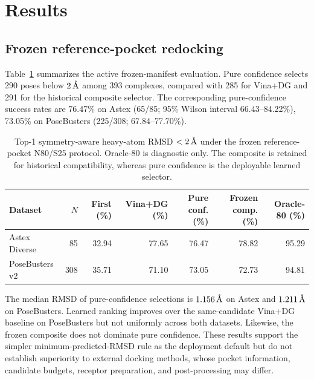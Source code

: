 \section{Results}
\label{sec:results}

\subsection{Frozen reference-pocket redocking}

Table~\ref{tab:frozen_benchmark} summarizes the active frozen-manifest
evaluation. Pure confidence selects 290 poses below \(2\,\text{\normalfont\AA}\) among
393 complexes, compared with 285 for Vina+DG and 291 for the historical
composite selector. The corresponding pure-confidence success rates are
76.47\% on Astex (65/85; 95\% Wilson interval 66.43--84.22\%), 73.05\% on
PoseBusters (225/308; 67.84--77.70\%).

\begin{table}[H]
    \centering
    \caption{Top-1 symmetry-aware heavy-atom RMSD \(<2\,\text{\normalfont\AA}\) under
    the frozen reference-pocket N80/S25 protocol. Oracle-80 is diagnostic
    only. The composite is retained for historical compatibility, whereas
    pure confidence is the deployable learned selector.}
    \label{tab:frozen_benchmark}
    \begingroup
    \small
    \setlength{\tabcolsep}{3.5pt}
    \begin{tabular}{lrrrrrr}
        \toprule
        Dataset & \(N\) & First (\%) & Vina+DG (\%) & Pure conf. (\%) &
        Frozen comp. (\%) & Oracle-80 (\%) \\
        \midrule
        Astex Diverse & 85  & 32.94 & 77.65 & 76.47 & 78.82 & 95.29 \\
        PoseBusters v2 & 308 & 35.71 & 71.10 & 73.05 & 72.73 & 94.81 \\
        \bottomrule
    \end{tabular}
    \endgroup
\end{table}

The median RMSD of pure-confidence selections is \(1.156\,\text{\normalfont\AA}\) on
Astex and \(1.211\,\text{\normalfont\AA}\) on PoseBusters. Learned ranking improves over
the same-candidate Vina+DG baseline on PoseBusters but not uniformly across
both datasets. Likewise,
the frozen composite does not dominate pure confidence. These results support
the simpler minimum-predicted-RMSD rule as the deployment default but do not
establish superiority to external docking methods, whose pocket information,
candidate budgets, receptor preparation, and post-processing may differ.

